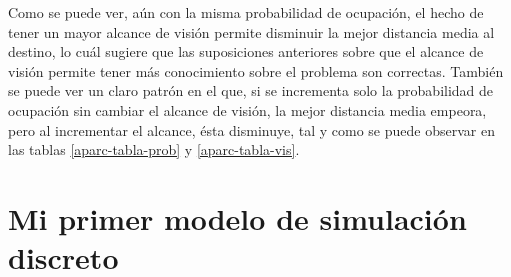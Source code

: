 \documentclass[11pt,a4paper]{report}
\begin{document}
Como se puede ver, aún con la misma probabilidad de ocupación, el hecho de tener un mayor alcance de visión permite
disminuir la mejor distancia media al destino, lo cuál sugiere que las suposiciones anteriores sobre que el alcance de
visión permite tener más conocimiento sobre el problema son correctas. También se puede ver un claro patrón en el que,
si se incrementa solo la probabilidad de ocupación sin cambiar el alcance de visión, la mejor distancia media empeora,
pero al incrementar el alcance, ésta disminuye, tal y como se puede observar en las tablas \ref{aparc-tabla-prob} y
\ref{aparc-tabla-vis}.

\newpage

\chapter{Mi primer modelo de simulación discreto}
\end{document}
